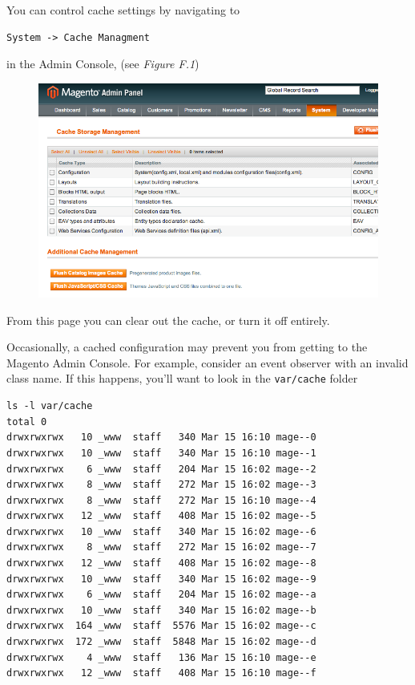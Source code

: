 \documentclass[oneside]{book}
\begin{document}
You can control cache settings by navigating to 

\begin{lstlisting}
System -> Cache Managment

\end{lstlisting}


in the Admin Console, (see \emph{Figure F.1}) 

\begin{figure}[htb]
\begin{center}
\leavevmode
\includegraphics[width=1\textwidth]{images/appendix_f/cache-manage.png}
\end{center}
\caption{}
\end{figure}


From this page you can clear out the cache, or turn it off entirely.    

Occasionally, a cached configuration may prevent you from getting to the Magento Admin Console.  For example, consider an event observer with an invalid class name.  If this happens, you'll want to look in the \footnotesize\texttt{var/cache} \normalsize  folder

\begin{lstlisting}
ls -l var/cache
total 0
drwxrwxrwx   10 _www  staff   340 Mar 15 16:10 mage--0
drwxrwxrwx   10 _www  staff   340 Mar 15 16:10 mage--1
drwxrwxrwx    6 _www  staff   204 Mar 15 16:02 mage--2
drwxrwxrwx    8 _www  staff   272 Mar 15 16:02 mage--3
drwxrwxrwx    8 _www  staff   272 Mar 15 16:10 mage--4
drwxrwxrwx   12 _www  staff   408 Mar 15 16:02 mage--5
drwxrwxrwx   10 _www  staff   340 Mar 15 16:02 mage--6
drwxrwxrwx    8 _www  staff   272 Mar 15 16:02 mage--7
drwxrwxrwx   12 _www  staff   408 Mar 15 16:02 mage--8
drwxrwxrwx   10 _www  staff   340 Mar 15 16:02 mage--9
drwxrwxrwx    6 _www  staff   204 Mar 15 16:02 mage--a
drwxrwxrwx   10 _www  staff   340 Mar 15 16:02 mage--b
drwxrwxrwx  164 _www  staff  5576 Mar 15 16:02 mage--c
drwxrwxrwx  172 _www  staff  5848 Mar 15 16:02 mage--d
drwxrwxrwx    4 _www  staff   136 Mar 15 16:10 mage--e
drwxrwxrwx   12 _www  staff   408 Mar 15 16:10 mage--f

\end{lstlisting}
\end{document}
